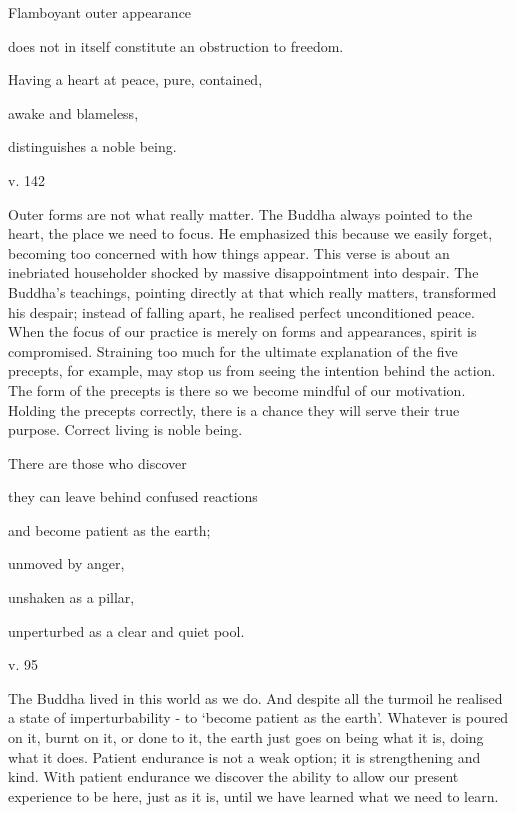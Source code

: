 \documentclass[a4paper,portrait,12pt]{article}
\begin{document}
Flamboyant outer appearance


does not in itself constitute an obstruction to freedom.


Having a heart at peace, pure, contained, 


awake and blameless,


distinguishes a noble being.





v. 142 





Outer forms are not what really matter. The Buddha always pointed to the heart, the place we need to focus. He emphasized this because we easily forget, becoming too concerned with how things appear. This verse is about an inebriated householder shocked by massive disappointment into despair. The Buddha's teachings, pointing directly at that which really matters, transformed his despair; instead of falling apart, he realised perfect unconditioned peace. When the focus of our practice is merely on forms and appearances, spirit is compromised. Straining too much for the ultimate explanation of the five precepts, for example, may stop us from seeing the intention behind the action. The form of the precepts is there so we become mindful of our motivation. Holding the precepts correctly, there is a chance they will serve their true purpose. Correct living is noble being.














There are those who discover 


they can leave behind confused reactions 


and become patient as the earth;


unmoved by anger,


unshaken as a pillar,


unperturbed as a clear and quiet pool.





v. 95





The Buddha lived in this world as we do. And despite all the turmoil he realised a state of imperturbability - to `become patient as the earth'. Whatever is poured on it, burnt on it, or done to it, the earth just goes on being what it is, doing what it does. Patient endurance is not a weak option; it is strengthening and kind. With patient endurance we discover the ability to allow our present experience to be here, just as it is, until we have learned what we need to learn.
\end{document}
